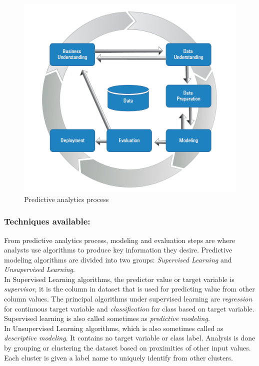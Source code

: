\documentclass[runningheads]{llncs}
\begin{document}
\begin{figure}[htbp]
	\centering
	
	\includegraphics[scale=0.7]{Figure1.png}
	\caption{Predictive analytics process}
	\label{fig:Figure1}
\end{figure}
\newline
\subsubsection{Techniques available:}
From predictive analytics process, modeling and evaluation steps are where analysts use algorithms to produce key information they desire. Predictive modeling algorithms \cite{7} are divided into two groups: \textit{Supervised Learning} and \textit{Unsupervised Learning}. \\
In Supervised Learning algorithms, the predictor value or target variable is \textit{supervisor}, it is the column in dataset that is used for predicting value from other column values. The principal algorithms under supervised learning are \textit{regression} for continuous target variable and \textit{classification} for class based on target variable. Supervised learning is also called sometimes as \textit{predictive modeling}. \\
In Unsupervised Learning algorithms, which is also sometimes called as \textit{descriptive modeling}. It contains no target variable or class label. Analysis is done by grouping or clustering the dataset based on proximities of other input values. Each cluster is given a label name to uniquely identify from other clusters.
\end{document}
